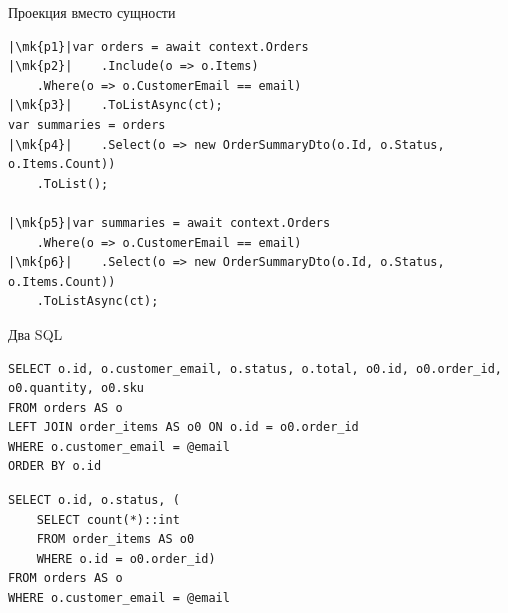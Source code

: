 \documentclass[aspectratio=169,10pt,t]{beamer}
\newcommand{\codexs}{\ttfamily\fontsize{7.0}{8.3}\selectfont}
\newcommand{\termsm}{\ttfamily\fontsize{6.6}{7.9}\selectfont}
\newcommand{\mk}[1]{\tikz[remember picture,overlay]\coordinate (#1) at (0,0.55ex);}
\begin{document}
\begin{frame}[fragile]{Проекция вместо сущности}
  \vspace{0.3em}
\begin{lstlisting}[style=csharp,basicstyle=\codexs,escapechar=|]
|\mk{p1}|var orders = await context.Orders
|\mk{p2}|    .Include(o => o.Items)
    .Where(o => o.CustomerEmail == email)
|\mk{p3}|    .ToListAsync(ct);
var summaries = orders
|\mk{p4}|    .Select(o => new OrderSummaryDto(o.Id, o.Status, o.Items.Count))
    .ToList();

|\mk{p5}|var summaries = await context.Orders
    .Where(o => o.CustomerEmail == email)
|\mk{p6}|    .Select(o => new OrderSummaryDto(o.Id, o.Status, o.Items.Count))
    .ToListAsync(ct);
\end{lstlisting}

  \slidegap
\end{frame}

\begin{frame}[fragile]{Два SQL}
  \slidetop
\begin{lstlisting}[style=term,basicstyle=\termsm]
SELECT o.id, o.customer_email, o.status, o.total, o0.id, o0.order_id, o0.quantity, o0.sku
FROM orders AS o
LEFT JOIN order_items AS o0 ON o.id = o0.order_id
WHERE o.customer_email = @email
ORDER BY o.id
\end{lstlisting}

\begin{lstlisting}[style=term,basicstyle=\termsm]
SELECT o.id, o.status, (
    SELECT count(*)::int
    FROM order_items AS o0
    WHERE o.id = o0.order_id)
FROM orders AS o
WHERE o.customer_email = @email
\end{lstlisting}

\end{frame}
\end{document}
